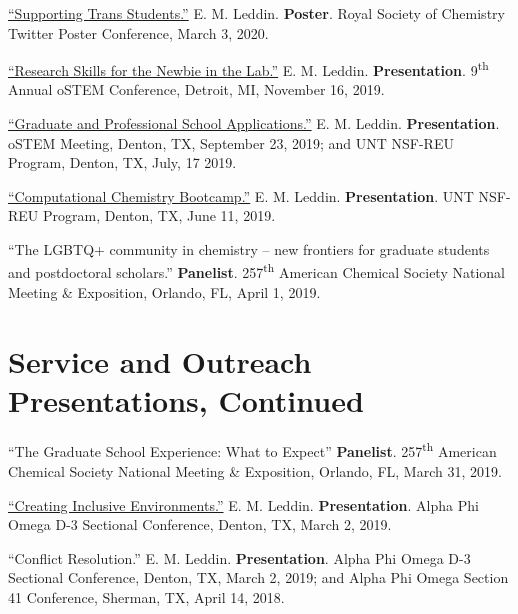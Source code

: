 \documentclass[letterpaper,11pt]{article}
\begin{document}
\begin{etaremune}[start=15]
{  \item \textnormal{\href{https://twitter.com/EmLedd1/status/1234812260515749889?s=20}{``Supporting Trans Students.''} E. M. Leddin. \textbf{Poster}. Royal Society of Chemistry Twitter Poster Conference, March 3, 2020.}
  \item \textnormal{\href{http://bit.ly/2019-oSTEM-PROF10}{``Research Skills for the Newbie in the Lab.''} E. M. Leddin. \textbf{Presentation}. 9\textsuperscript{th} Annual oSTEM Conference, Detroit, MI, November 16, 2019.}
\item \textnormal{\href{https://www.youtube.com/watch?v=6VkSUhsZr40&feature=youtu.be}{``Graduate and Professional School Applications.''} E. M. Leddin. \textbf{Presentation}. oSTEM Meeting, Denton, TX, September 23, 2019; and UNT NSF-REU Program, Denton, TX, July, 17 2019.}
  \item \textnormal{\href{http://bit.ly/2019-UNTREU-CCBC}{``Computational Chemistry Bootcamp.''} E. M. Leddin. \textbf{Presentation}. UNT NSF-REU Program, Denton, TX, June 11, 2019.}
  \item \textnormal{``The LGBTQ+ community in chemistry -- new frontiers for graduate students and postdoctoral scholars.'' \textbf{Panelist}. 257\textsuperscript{th} American Chemical Society National Meeting \& Exposition, Orlando, FL, April 1, 2019.}
  }
\end{etaremune}  
  
\section{Service and Outreach Presentations, Continued}
\begin{etaremune}[start=3]
\small{
  \item \textnormal{``The Graduate School Experience: What to Expect'' \textbf{Panelist}. 257\textsuperscript{th} American Chemical Society National Meeting \& Exposition, Orlando, FL, March 31, 2019.}
  \item \textnormal{ \href{https://docs.google.com/presentation/d/1mKDUxe-elMQ7EkTBglIQBeZlcsdBwmfP5loLxAsshF0/edit}{``Creating Inclusive Environments.''} E. M. Leddin. \textbf{Presentation}. Alpha Phi Omega D-3 Sectional Conference, Denton, TX, March 2, 2019.}
  \item \textnormal{``Conflict Resolution.'' E. M. Leddin. \textbf{Presentation}. Alpha Phi Omega D-3 Sectional Conference, Denton, TX, March 2, 2019; and Alpha Phi Omega Section 41 Conference, Sherman, TX, April 14, 2018.}
  }
\end{etaremune}
\end{document}
